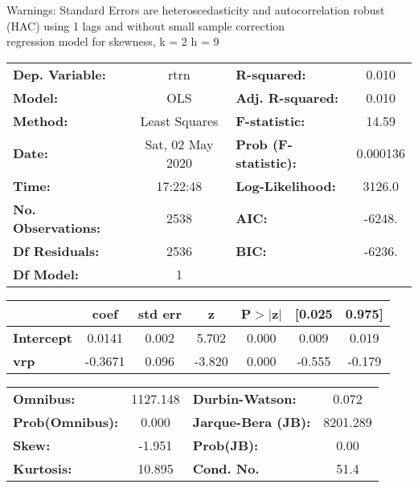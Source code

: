 Warnings: \newline
 [1] Standard Errors are heteroscedasticity and autocorrelation robust (HAC) using 1 lags and without small sample correction\\ 

regression model for skewness, k = 2 h = 9\begin{center}
\begin{tabular}{lclc}
\toprule
\textbf{Dep. Variable:}    &       rtrn       & \textbf{  R-squared:         } &     0.010   \\
\textbf{Model:}            &       OLS        & \textbf{  Adj. R-squared:    } &     0.010   \\
\textbf{Method:}           &  Least Squares   & \textbf{  F-statistic:       } &     14.59   \\
\textbf{Date:}             & Sat, 02 May 2020 & \textbf{  Prob (F-statistic):} &  0.000136   \\
\textbf{Time:}             &     17:22:48     & \textbf{  Log-Likelihood:    } &    3126.0   \\
\textbf{No. Observations:} &        2538      & \textbf{  AIC:               } &    -6248.   \\
\textbf{Df Residuals:}     &        2536      & \textbf{  BIC:               } &    -6236.   \\
\textbf{Df Model:}         &           1      & \textbf{                     } &             \\
\bottomrule
\end{tabular}
\begin{tabular}{lcccccc}
                   & \textbf{coef} & \textbf{std err} & \textbf{z} & \textbf{P$> |$z$|$} & \textbf{[0.025} & \textbf{0.975]}  \\
\midrule
\textbf{Intercept} &       0.0141  &        0.002     &     5.702  &         0.000        &        0.009    &        0.019     \\
\textbf{vrp}       &      -0.3671  &        0.096     &    -3.820  &         0.000        &       -0.555    &       -0.179     \\
\bottomrule
\end{tabular}
\begin{tabular}{lclc}
\textbf{Omnibus:}       & 1127.148 & \textbf{  Durbin-Watson:     } &    0.072  \\
\textbf{Prob(Omnibus):} &   0.000  & \textbf{  Jarque-Bera (JB):  } & 8201.289  \\
\textbf{Skew:}          &  -1.951  & \textbf{  Prob(JB):          } &     0.00  \\
\textbf{Kurtosis:}      &  10.895  & \textbf{  Cond. No.          } &     51.4  \\
\bottomrule
\end{tabular}
\end{center}

